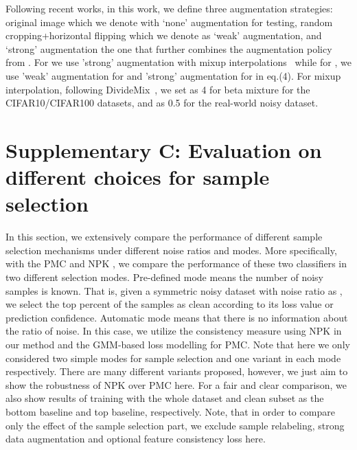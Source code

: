 \documentclass{bmvc2k}
\begin{document}
Following recent works, in this work, we define three augmentation strategies: original image which we denote with `none' augmentation for testing, random cropping+horizontal flipping which we denote as `weak' augmentation, and `strong' augmentation  the one that further combines the augmentation policy from \citep{autoaugment}. For  we use 'strong' augmentation with mixup interpolations~\citep{Mixup} while for , we use 'weak' augmentation for  and 'strong' augmentation for  in eq.(4).
For mixup interpolation, following DivideMix~\citep{dividemix}, we set  as 4 for beta mixture for the CIFAR10/CIFAR100 datasets, and as 0.5 for the real-world noisy dataset. 

\section*{Supplementary C: Evaluation on different choices for sample selection}
\label{sup:c}

In this section, we extensively compare the performance of different sample selection mechanisms under different noise ratios and modes. More specifically, with the PMC  and NPK , we compare the performance of these two classifiers in two different selection modes. Pre-defined mode means the number of noisy samples is known. That is, given a symmetric noisy dataset with noise ratio as , we select the top  percent of the samples as clean according to its loss value or prediction confidence. Automatic mode means that there is no information about the ratio of noise. In this case, we utilize the consistency measure  using NPK in our method and the GMM-based loss modelling for PMC. Note that here we only considered two simple modes for sample selection and one variant in each mode respectively. There are many different variants proposed, however, we just aim to show the robustness of NPK over PMC here.  For a fair and clear comparison, we also show results of training with the whole dataset and clean subset as the bottom baseline and top baseline, respectively. Note, that in order to compare only the effect of the sample selection part, we exclude sample relabeling, strong data augmentation and optional feature consistency loss here.
\end{document}
